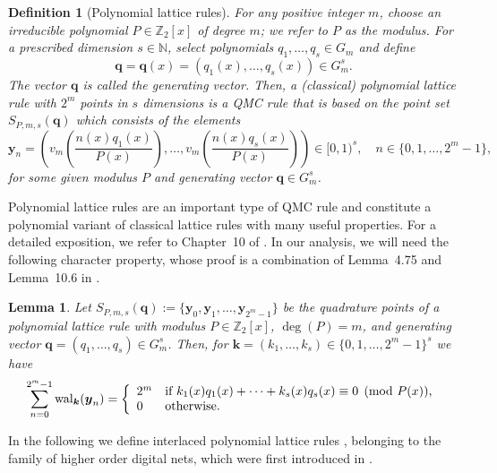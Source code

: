 \documentclass[namedate,webpdf,imanum]{ima-authoring-arxiv}%
\theoremstyle{thmstyletwo}%
\newtheorem{lemma}{Lemma}
\newtheorem{definition}{Definition}
\numberwithin{equation}{section}
\newcommand{\wal}{{\rm wal}}
\newcommand{\bsy}{\boldsymbol{y}}
\newcommand{\bsk}{\boldsymbol{k}}
\newcommand{\bsq}{\boldsymbol{q}}
\begin{document}
\begin{definition}[Polynomial lattice rules] 
For any positive integer $m$, choose an irreducible polynomial $P\in\mathbb{Z}_2[x]$ of degree $m$; we refer to $P$ as the \emph{modulus}. For a prescribed dimension $s\in\mathbb{N}$, select polynomials $q_1,\ldots,q_s\in G_m$ and define
\begin{equation*}
\bsq = \bsq(x) = (q_1(x), \dots, q_s(x)) \in G^s_m.
\end{equation*}
The vector $\bsq$ is called the \emph{generating vector}. Then, a {\it (classical) polynomial lattice rule} with $2^m$ points in $s$ dimensions is a QMC rule that is based on the point set $S_{P,m,s}(\bsq)$ which consists of the elements
\[
\bsy_n = \left( v_m\left( \frac{n(x) q_1(x)}{P(x)} \right), \dots, v_m\left( \frac{n(x) q_s(x)}{P(x)} \right) \right) \in [0,1)^s, \quad n \in \{0,1, \dots, 2^m-1\},
\]
for some given modulus $P$ and generating vector $\bsq \in G^{s}_{m}$. 
\end{definition}

Polynomial lattice rules are an important type of QMC rule and constitute a polynomial variant of classical lattice rules with many useful properties. For a detailed exposition, we refer to Chapter~10 of \cite{DP10}. In our analysis, we will need the following character property, whose proof is a combination of Lemma~4.75 and Lemma~10.6 in \cite{DP10}. 

\begin{lemma}\label{le:charprop}
Let $S_{P,m,s}(\bsq):=\{\bsy_0,\bsy_1,\ldots,\bsy_{2^m-1}\}$ be the quadrature points of a polynomial lattice rule with modulus $P \in \mathbb{Z}_2[x]$, $\deg(P)=m$, and generating vector $\bsq=(q_1,\ldots,q_s) \in G_m^s$. Then, for $\bsk=(k_1,\ldots,k_s) \in \{0,1,\ldots,2^m-1\}^s$  we have $$\sum_{n=0}^{2^m-1} \wal_{\bsk}(\bsy_n)=\left\{ 
\begin{array}{ll}
2^m & \mbox{if $k_1(x) q_1(x)+\cdots+k_s(x) q_s(x) \equiv 0 \pmod{P(x)}$,}\\
0 & \mbox{otherwise}.
\end{array}
\right.
$$     
\end{lemma}



In the following we define interlaced polynomial lattice rules \citep{DKLNS14, G15}, belonging to the family of higher order digital nets, which were first introduced in \cite{dick08}.
\end{document}
